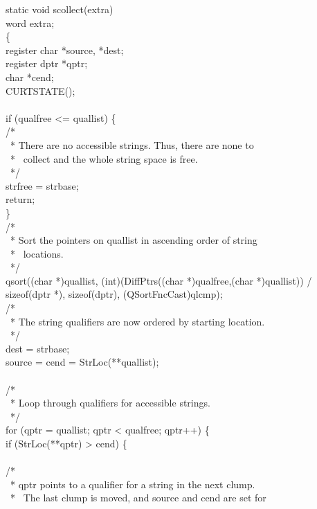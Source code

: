 %
\begin{iconcode}
static void scollect(extra)\\
word extra;\\
\>\{\\
\>register char *source, *dest;\\
\>register dptr *qptr;\\
\>char *cend;\\
\>CURTSTATE();\\
\\
\>if (qualfree <= quallist) \{\\
\>\>/*\\
\>\>\ * There are no accessible strings. Thus, there are none to\\
\>\>\ * \ collect and the whole string space is free.\\
\>\>\ */\\
\>\>strfree = strbase;\\
\>\>return;\\
\>\>\}\\
\>/*\\
\>\ * Sort the pointers on quallist in ascending order of string\\
\>\ * \ locations.\\
\>\ */\\
\>qsort((char *)quallist, (int)(DiffPtrs((char *)qualfree,(char *)quallist)) /\\
\>\>sizeof(dptr *), sizeof(dptr), (QSortFncCast)qlcmp);\\
\>/*\\
\>\ * The string qualifiers are now ordered by starting location.\\
\>\ */\\
\>dest = strbase;\\
\>source = cend = StrLoc(**quallist);\\
\\
\>/*\\
\>\ * Loop through qualifiers for accessible strings.\\
\>\ */\\
\>for (qptr = quallist; qptr < qualfree; qptr++) \{\\
\>\>if (StrLoc(**qptr) > cend) \{\\
\\
\>\>\>/*\\
\>\>\>\ * qptr points to a qualifier for a string in the next clump.\\
\>\>\>\ * \ The last clump is moved, and source and cend are set for\\

\end{iconcode}
